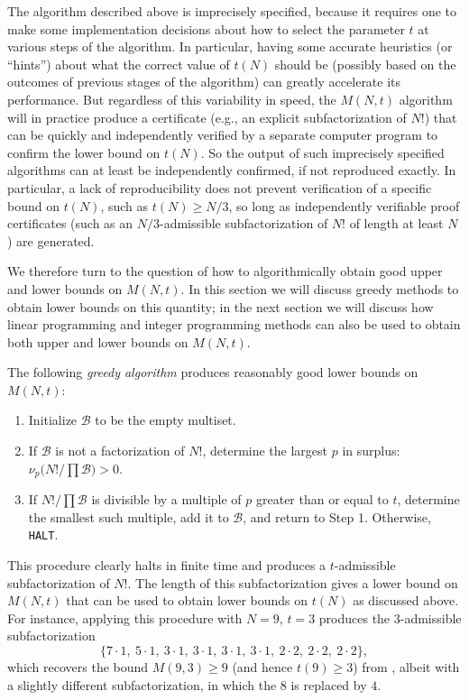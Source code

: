 \documentclass[10pt,a4paper,reqno]{amsart}
\numberwithin{equation}{section}
\theoremstyle{plain}
\theoremstyle{definition}
\newcommand\tuple{{\mathcal B}}
\begin{document}
The algorithm described above is imprecisely specified, because it requires one to make some implementation decisions about how to select the parameter $t$ at various steps of the algorithm. In particular, having some accurate heuristics (or ``hints'') about what the correct value of $t(N)$ should be (possibly based on the outcomes of previous stages of the algorithm) can greatly accelerate its performance.  But regardless of this variability in speed, the $M(N,t)$ algorithm will in practice produce a certificate (e.g., an explicit subfactorization of $N!$) that can be quickly and independently verified by a separate computer program to confirm the lower bound on $t(N)$.  So the output of such imprecisely specified algorithms can at least be independently confirmed, if not reproduced exactly.  In particular, a lack of reproducibility does not prevent verification of a specific bound on $t(N)$, such as $t(N) \geq N/3$, so long as independently verifiable proof certificates (such as an $N/3$-admissible subfactorization of $N!$ of length at least $N$) are generated.

We therefore turn to the question of how to algorithmically obtain good upper and lower bounds on $M(N,t)$.  In this section we will discuss greedy methods to obtain lower bounds on this quantity; in the next section we will discuss how linear programming and integer programming methods can also be used to obtain both upper and lower bounds on $M(N,t)$.

The following \textit{greedy algorithm} produces reasonably good lower bounds on $M(N,t)$:

\begin{enumerate}
\item[Step 0:] Initialize $\tuple$ to be the empty multiset. 
\item[Step 1:] If $\tuple$ is not a factorization of $N!$, determine the largest $p$ in surplus: $\nu_p\bigl(N!/\prod \tuple\bigr) > 0$. 
\item[Step 2:] If $N! / \prod \tuple$ is divisible by a multiple of $p$ greater than or equal to $t$, determine the smallest such multiple, add it to $\tuple$, and return to Step 1.  Otherwise, \texttt{HALT}. 
\end{enumerate}

This procedure clearly halts in finite time and produces a $t$-admissible subfactorization of $N!$.
The length of this subfactorization gives a lower bound on $M(N,t)$ that can be used to obtain lower bounds on $t(N)$ as discussed above.  For instance, applying this procedure with $N=9$, $t=3$ produces the $3$-admissible subfactorization
\[
\bigl\{7 \cdot 1,\ 5 \cdot 1,\ 3 \cdot 1,\ 3 \cdot 1,\ 3 \cdot 1,\ 3 \cdot 1,\ 2 \cdot 2,\ 2 \cdot 2,\ 2 \cdot 2 \bigr\},
\]
which recovers the bound $M(9,3) \geq 9$ (and hence $t(9) \geq 3$) from , albeit with a slightly different subfactorization, in which the $8$ is replaced by $4$.
\end{document}
